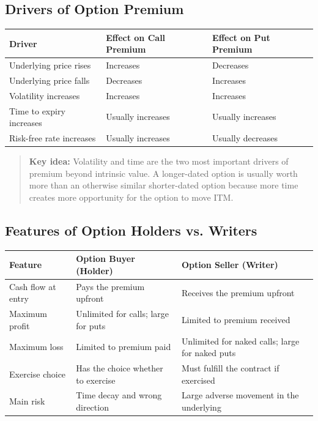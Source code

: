 \documentclass[12pt,openany]{book}
\begin{document}
\subsection{Drivers of Option Premium}

\begin{center}
\small
\begin{tabular}{|L{4.2cm}|L{4.8cm}|L{4.8cm}|}
\hline
\textbf{Driver} & \textbf{Effect on Call Premium} & \textbf{Effect on Put Premium} \\
\hline
Underlying price rises & Increases & Decreases \\
\hline
Underlying price falls & Decreases & Increases \\
\hline
Volatility increases & Increases & Increases \\
\hline
Time to expiry increases & Usually increases & Usually increases \\
\hline
Risk-free rate increases & Usually increases & Usually decreases \\
\hline
\end{tabular}
\end{center}

\begin{quote}
\textbf{Key idea:} Volatility and time are the two most important drivers of premium beyond intrinsic value. A longer-dated option is usually worth more than an otherwise similar shorter-dated option because more time creates more opportunity for the option to move ITM.
\end{quote}

\subsection{Features of Option Holders vs. Writers}

\begin{center}
\small
\begin{tabular}{|L{4.5cm}|L{5cm}|L{5cm}|}
\hline
\textbf{Feature} & \textbf{Option Buyer (Holder)} & \textbf{Option Seller (Writer)} \\
\hline
Cash flow at entry & Pays the premium upfront & Receives the premium upfront \\
\hline
Maximum profit & Unlimited for calls; large for puts & Limited to premium received \\
\hline
Maximum loss & Limited to premium paid & Unlimited for naked calls; large for naked puts \\
\hline
Exercise choice & Has the choice whether to exercise & Must fulfill the contract if exercised \\
\hline
Main risk & Time decay and wrong direction & Large adverse movement in the underlying \\
\hline
\end{tabular}
\end{center}
\end{document}
